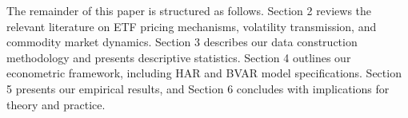 The remainder of this paper is structured as follows. Section 2 reviews the relevant literature on ETF pricing mechanisms, volatility transmission, and commodity market dynamics. Section 3 describes our data construction methodology and presents descriptive statistics. Section 4 outlines our econometric framework, including HAR and BVAR model specifications. Section 5 presents our empirical results, and Section 6 concludes with implications for theory and practice.
